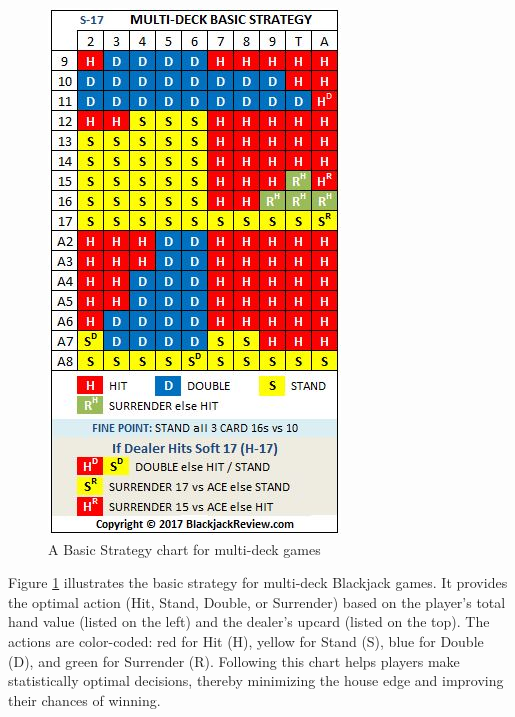 \documentclass[a4paper,12pt]{report}
\begin{document}
\begin{figure}[htbp]
\begin{center}
\includegraphics[scale=0.5,keepaspectratio]{figures/BasicStrategy_Multideck.jpg}
\end{center}
\caption{A Basic Strategy chart for multi-deck games}
\label{fig:BasicStrategy_Multideck}
\end{figure}

Figure \ref{fig:BasicStrategy_Multideck} illustrates the basic strategy for multi-deck Blackjack games. It provides the optimal action (Hit, Stand, Double, or Surrender) based on the player’s total hand value (listed on the left) and the dealer’s upcard (listed on the top). The actions are color-coded: red for Hit (H), yellow for Stand (S), blue for Double (D), and green for Surrender (R). Following this chart helps players make statistically optimal decisions, thereby minimizing the house edge and improving their chances of winning.
\end{document}
